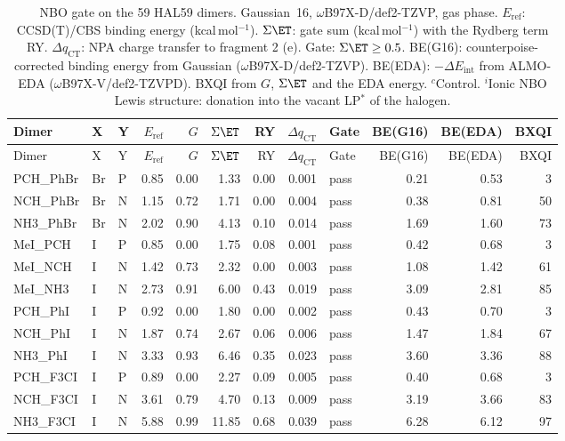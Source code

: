 {\scriptsize
\setlength{\tabcolsep}{3pt}
\begin{longtable}{lllrrrrrlrrr}
\caption{NBO gate on the 59 HAL59 dimers. Gaussian~16, $\omega$B97X-D/def2-TZVP, gas phase. $E_\mathrm{ref}$: CCSD(T)/CBS binding energy (kcal\,mol$^{-1}$). $\Sigma\ET$: gate sum (kcal\,mol$^{-1}$) with the Rydberg term RY. $\Delta q_\mathrm{CT}$: NPA charge transfer to fragment 2 (e). Gate: $\Sigma\ET \ge 0.5$. BE(G16): counterpoise-corrected binding energy from Gaussian ($\omega$B97X-D/def2-TZVP). BE(EDA): $-\Delta E_\mathrm{int}$ from ALMO-EDA ($\omega$B97X-V/def2-TZVPD). BXQI from $G$, $\Sigma\ET$ and the EDA energy. $^c$Control. $^i$Ionic NBO Lewis structure: donation into the vacant LP$^*$ of the halogen.}\label{tab:qmhal}\\
\toprule
Dimer & X & Y & $E_\mathrm{ref}$ & $G$ & $\Sigma\ET$ & RY & $\Delta q_\mathrm{CT}$ & Gate & BE(G16) & BE(EDA) & BXQI\\
\midrule
\endfirsthead
\toprule
Dimer & X & Y & $E_\mathrm{ref}$ & $G$ & $\Sigma\ET$ & RY & $\Delta q_\mathrm{CT}$ & Gate & BE(G16) & BE(EDA) & BXQI\\
\midrule
\endhead
\bottomrule
\endlastfoot
PCH\_PhBr & Br & P & 0.85 & 0.00 & 1.33 & 0.00 & 0.001 & pass & 0.21 & 0.53 & 3\\
NCH\_PhBr & Br & N & 1.15 & 0.72 & 1.71 & 0.00 & 0.004 & pass & 0.38 & 0.81 & 50\\
NH3\_PhBr & Br & N & 2.02 & 0.90 & 4.13 & 0.10 & 0.014 & pass & 1.69 & 1.60 & 73\\
MeI\_PCH & I & P & 0.85 & 0.00 & 1.75 & 0.08 & 0.001 & pass & 0.42 & 0.68 & 3\\
MeI\_NCH & I & N & 1.42 & 0.73 & 2.32 & 0.00 & 0.003 & pass & 1.08 & 1.42 & 61\\
MeI\_NH3 & I & N & 2.73 & 0.91 & 6.00 & 0.43 & 0.019 & pass & 3.09 & 2.81 & 85\\
PCH\_PhI & I & P & 0.92 & 0.00 & 1.80 & 0.00 & 0.002 & pass & 0.43 & 0.70 & 3\\
NCH\_PhI & I & N & 1.87 & 0.74 & 2.67 & 0.06 & 0.006 & pass & 1.47 & 1.84 & 67\\
NH3\_PhI & I & N & 3.33 & 0.93 & 6.46 & 0.35 & 0.023 & pass & 3.60 & 3.36 & 88\\
PCH\_F3CI & I & P & 0.89 & 0.00 & 2.27 & 0.09 & 0.005 & pass & 0.40 & 0.68 & 3\\
NCH\_F3CI & I & N & 3.61 & 0.79 & 4.70 & 0.13 & 0.009 & pass & 3.19 & 3.66 & 83\\
NH3\_F3CI & I & N & 5.88 & 0.99 & 11.85 & 0.68 & 0.039 & pass & 6.28 & 6.12 & 97\\

\end{longtable}}
